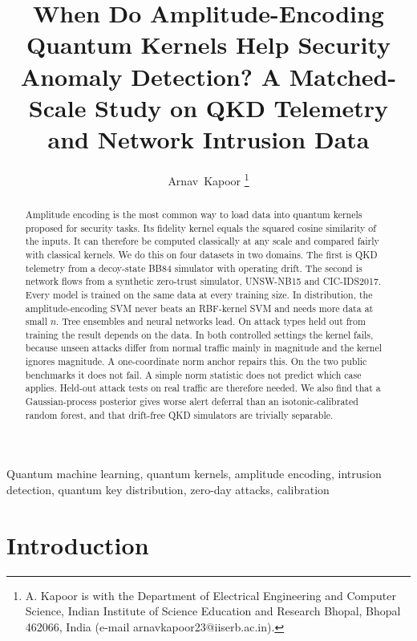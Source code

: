 \documentclass[journal]{IEEEtran}
\begin{document}
\title{When Do Amplitude-Encoding Quantum Kernels Help Security Anomaly Detection? A Matched-Scale Study on QKD Telemetry and Network Intrusion Data}

\author{Arnav~Kapoor%
\thanks{A. Kapoor is with the Department of Electrical Engineering and Computer Science, Indian Institute of Science Education and Research Bhopal, Bhopal 462066, India (e-mail arnavkapoor23@iiserb.ac.in).}}


\maketitle

\begin{abstract}
Amplitude encoding is the most common way to load data into quantum kernels
proposed for security tasks. Its fidelity kernel equals the squared cosine
similarity of the inputs. It can therefore be computed classically at any scale
and compared fairly with classical kernels. We do this on four datasets in two
domains. The first is QKD telemetry from a decoy-state BB84 simulator with
operating drift. The second is network flows from a synthetic zero-trust
simulator, UNSW-NB15 and CIC-IDS2017. Every model is trained on the same data at
every training size. In distribution, the amplitude-encoding SVM never beats an
RBF-kernel SVM and needs more data at small $n$. Tree ensembles and neural
networks lead. On attack types held out from training the result depends on the
data. In both controlled settings the kernel fails, because unseen attacks differ
from normal traffic mainly in magnitude and the kernel ignores magnitude. A
one-coordinate norm anchor repairs this. On the two public benchmarks it does not
fail. A simple norm statistic does not predict which case applies. Held-out
attack tests on real traffic are therefore needed. We also find that a
Gaussian-process posterior gives worse alert deferral than an isotonic-calibrated
random forest, and that drift-free QKD simulators are trivially separable.
\end{abstract}

\begin{IEEEkeywords}
Quantum machine learning, quantum kernels, amplitude encoding, intrusion detection, quantum key distribution, zero-day attacks, calibration
\end{IEEEkeywords}

\section{Introduction}
\end{document}
